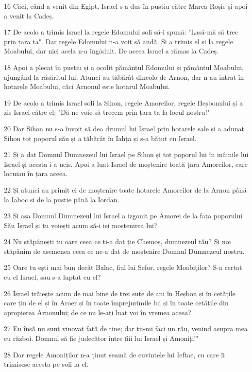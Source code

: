 \par 16 Căci, când a venit din Egipt, Israel s-a dus în pustiu către Marea Roșie și apoi a venit la Cadeș.
\par 17 De acolo a trimis Israel la regele Edomului soli să-i spună: "Lasă-mă să trec prin țara ta". Dar regele Edomului n-a voit să audă. Și a trimis el și la regele Moabului, dar nici acela n-a îngăduit. De aceea Israel a rămas la Cadeș.
\par 18 Apoi a plecat în pustiu și a ocolit pământul Edomului și pământul Moabului, ajungând la răsăritul lui. Atunci au tăbărât dincolo de Arnon, dar n-au intrat în hotarele Moabului, căci Arnonul este hotarul Moabului.
\par 19 De acolo a trimis Israel soli la Sihon, regele Amoreilor, regele Heșbonului și a zis Israel către el: "Dă-ne voie să trecem prin țara ta la locul nostru!"
\par 20 Dar Sihon nu s-a învoit să dea drumul lui Israel prin hotarele sale și a adunat Sihon tot poporul său și a tăbărât în Iahța și s-a bătut cu Israel.
\par 21 Și a dat Domnul Dumnezeul lui Israel pe Sihon și tot poporul lui în mâinile lui Israel și acesta i-a ucis. Apoi a luat Israel de moștenire toată țara Amoreilor, care locuiau în țara aceea.
\par 22 Și atunci au primit ei de moștenire toate hotarele Amoreilor de la Arnon până la Iaboc și de la pustie până la Iordan.
\par 23 Și așa Domnul Dumnezeul lui Israel a izgonit pe Amorei de la fața poporului Său Israel și tu voiești acum să-i iei moștenirea lui?
\par 24 Nu stăpânești tu oare ceea ce ti-a dat ție Chemoș, dumnezeul tău? Și noi stăpânim de asemenea ceea ce ne-a dat de moștenire Domnul Dumnezeul nostru.
\par 25 Oare tu ești mai bun decât Balac, fiul lui Sefor, regele Moabiților? S-a certat cu el Israel, sau s-a luptat cu el?
\par 26 Israel trăiește acum de mai bine de trei sute de ani în Heșbon și în cetățile care țin de el și în Aroer și în toate împrejurimile lui și în toate cetățile din apropierea Arnonului; de ce nu le-ați luat voi în vremea aceea?
\par 27 Eu însă nu sunt vinovat față de tine; dar tu-mi faci un rău, venind asupra mea cu război. Domnul să fie judecător între fiii lui Israel și Amoniți!"
\par 28 Dar regele Amoniților n-a ținut seamă de cuvintele lui Ieftae, cu care îi trimisese acesta pe soli la el.
